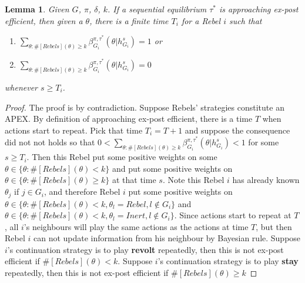 \documentclass[12pt,letter]{article}
\newtheorem{lemma}{Lemma}[section]
\theoremstyle{definition}
\theoremstyle{remark}
\theoremstyle{claim}
\begin{document}
\begin{lemma}\label{lemma_learn}
Given $G$, $\pi$, $\delta$, $k$. If a sequential equilibrium $\tau^*$ is approaching ex-post efficient, then given a $\theta$, there is a finite time $T_i$ for a Rebel $i$ such that
\begin{enumerate}
\item $\sum_{\theta:\#[Rebels](\theta)\geq k}\beta^{\pi,\tau^*}_{G_i}(\theta|h^{s}_{G_i})=1$  or
\item $\sum_{\theta:\#[Rebels](\theta)\geq k}\beta^{\pi,\tau^*}_{G_i}(\theta|h^{s}_{G_i})=0$ 
\end{enumerate}
whenever $s\geq T_i$.
\end{lemma}
\begin{proof}
The proof is by contradiction. Suppose Rebels' strategies constitute an APEX. By definition of approaching ex-post efficient, there is a time $T$ when actions start to repeat. Pick that time $T_i=T+1$ and suppose the consequence did not not holds so that $0<\sum_{\theta:\#[Rebels](\theta)\geq k}\beta^{\pi,\tau^*}_{G_i}(\theta|h^{s}_{G_i})<1$ for some $s\geq T_i$. Then this Rebel put some positive weights on some $\theta\in \{\theta:\#[Rebels](\theta)< k\}$ and put some positive weights on $\theta\in \{\theta:\#[Rebels](\theta)\geq k\}$ at that time $s$. Note this Rebel $i$ has already known $\theta_j$ if $j\in G_i$, and therefore Rebel $i$ put some positive weights on $\theta\in \{\theta:\#[Rebels](\theta)< k, \theta_l=Rebel, l\notin G_i\}$ and $\theta\in \{\theta:\#[Rebels](\theta)< k, \theta_l=Inert, l\notin G_i\}$. Since actions start to repeat at $T$, all $i$'s neighbours will play the same actions as the actions at time $T$, but then Rebel $i$ can not update information from his neighbour by Bayesian rule. Suppose $i$'s continuation strategy is to play \textbf{revolt} repeatedly, then this is not ex-post efficient if $\#[Rebels](\theta)< k$. Suppose $i$'s continuation strategy is to play \textbf{stay} repeatedly, then this is not ex-post efficient if $\#[Rebels](\theta)\geq k$
\end{proof}
\end{document}
